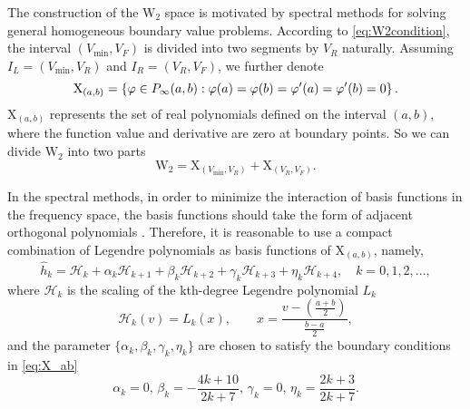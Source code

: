 The construction of the $\mathrm{W}_2$ space is motivated by spectral methods for solving general homogeneous boundary value problems.  According to \eqref{eq:W2condition}, the interval $(V_{\min},V_F) $ is divided into two segments by $V_R$ naturally. Assuming $I_L=(V_{\min},V_R)$ and $I_R=(V_R,V_F)$, we further denote
\begin{equation}
    \label{eq:X_ab}
        \mathrm{X}_{(a,b)}=\left\{\varphi \in P_{\infty}(a,b) : \varphi(a)=\varphi(b)=\varphi'(a)=\varphi'(b)=0   \right\}.\\
\end{equation}
$\mathrm{X}_{(a,b)}$ represents the set of real polynomials defined on the interval $(a, b)$, where the function value and derivative are zero at boundary points. So we can divide $\mathrm{W}_2$ into two parts 
\begin{equation}
    \mathrm{W}_2=\mathrm{X}_{(V_{\min},V_R)}+ \mathrm{X}_{(V_R,V_F)}.
\end{equation}

In the spectral methods, in order to minimize the interaction of basis functions in the frequency space, the basis functions should take the form of adjacent orthogonal polynomials \cite{shen1994efficient}. Therefore, it is reasonable to use a compact combination of Legendre polynomials as basis functions of $\mathrm{X}_{(a,b)}$, namely,
\begin{equation}
    \hat{h}_k=\mathcal{H}_k+\alpha_k\mathcal{H}_{k+1}+\beta_k\mathcal{H}_{k+2}+\gamma_k\mathcal{H}_{k+3}+\eta_k\mathcal{H}_{k+4},\quad k=0,1,2,...,
\end{equation}
where $\mathcal{H}_k$ is the scaling of the kth-degree Legendre polynomial $L_k$
\begin{equation}
    \mathcal{H}_k(v)=L_k(x),\qquad x=\frac{v-\left(\frac{a+b}{2}\right)}{\frac{b-a}{2}},
\end{equation}
and the parameter $\{\alpha_k,\beta_k,\gamma_k,\eta_k\}$ are chosen to satisfy the boundary conditions in \eqref{eq:X_ab}
\begin{equation}
    \alpha_k=0,\, \beta_k=-\frac{4k+10}{2k+7},\,\gamma_k=0,\,\eta_k=\frac{2k+3}{2k+7}.
\end{equation}




